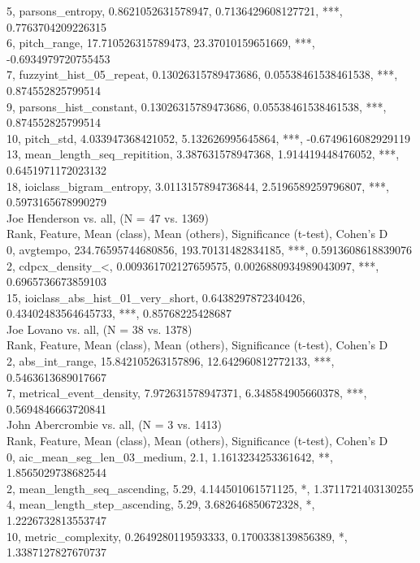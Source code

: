 5, parsons_entropy, 0.8621052631578947, 0.7136429608127721, ***, 0.7763704209226315\\
6, pitch_range, 17.710526315789473, 23.37010159651669, ***, -0.6934979720755453\\
7, fuzzyint_hist_05_repeat, 0.13026315789473686, 0.05538461538461538, ***, 0.874552825799514\\
9, parsons_hist_constant, 0.13026315789473686, 0.05538461538461538, ***, 0.874552825799514\\
10, pitch_std, 4.033947368421052, 5.132626995645864, ***, -0.6749616082929119\\
13, mean_length_seq_repitition, 3.387631578947368, 1.914419448476052, ***, 0.6451971172023132\\
18, ioiclass_bigram_entropy, 3.0113157894736844, 2.5196589259796807, ***, 0.5973165678990279\\
Joe Henderson vs. all, (N = 47 vs. 1369)\\
Rank, Feature, Mean (class), Mean (others), Significance (t-test), Cohen's D\\
0, avgtempo, 234.76595744680856, 193.70131482834185, ***, 0.5913608618839076\\
2, cdpcx_density_<, 0.009361702127659575, 0.0026880934989043097, ***, 0.6965736673859103\\
15, ioiclass_abs_hist_01_very_short, 0.6438297872340426, 0.43402483564645733, ***, 0.85768225428687\\
Joe Lovano vs. all, (N = 38 vs. 1378)\\
Rank, Feature, Mean (class), Mean (others), Significance (t-test), Cohen's D\\
2, abs_int_range, 15.842105263157896, 12.642960812772133, ***, 0.5463613689017667\\
7, metrical_event_density, 7.972631578947371, 6.348584905660378, ***, 0.5694846663720841\\
John Abercrombie vs. all, (N = 3 vs. 1413)\\
Rank, Feature, Mean (class), Mean (others), Significance (t-test), Cohen's D\\
0, aic_mean_seg_len_03_medium, 2.1, 1.1613234253361642, **, 1.8565029738682544\\
2, mean_length_seq_ascending, 5.29, 4.144501061571125, *, 1.3711721403130255\\
4, mean_length_step_ascending, 5.29, 3.682646850672328, *, 1.2226732813553747\\
10, metric_complexity, 0.2649280119593333, 0.1700338139856389, *, 1.3387127827670737\\
